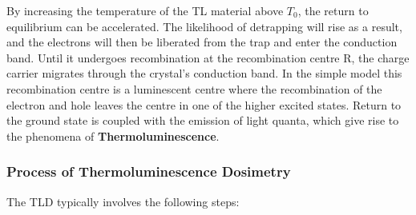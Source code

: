 \documentclass[../introduction.tex]{subfiles}
\begin{document}
        By increasing the temperature of the TL material above $T_0$, the return to equilibrium can be accelerated. 
        The likelihood of detrapping will rise as a result, and the electrons will then be liberated from the trap and 
        enter the conduction band. Until it undergoes recombination at the recombination centre R, the charge carrier 
        migrates through the crystal's conduction band. In the simple model this recombination centre is a luminescent
        centre where the recombination of the electron and hole leaves the centre in one of the higher excited states. 
        Return to the ground state is coupled with the emission of light quanta, which give rise to the phenomena of 
        \textbf{Thermoluminescence}.

    \subsubsection*{\large Process of Thermoluminescence Dosimetry}
        The TLD typically involves the following steps:
\end{document}
